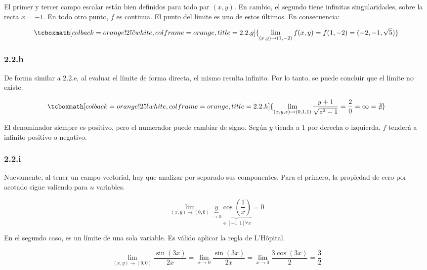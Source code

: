 \documentclass{article}
\begin{document}
El primer y tercer campo escalar están bien definidos para todo par $(x,y)$. En cambio, el segundo tiene infinitas singularidades, sobre la recta $x = -1$. En todo otro punto, $f$ es continua. El punto del límite es uno de estos últimos. En consecuencia:

\begin{equation}
\tcboxmath[colback=orange!25!white,colframe=orange,title=2.2.g]
{ \lim_{(x,y) \rightarrow (1,-2)} f(x,y) = f(1,-2) = (-2, -1, \sqrt{5}) }
\end{equation}

\subsubsection*{2.2.h}
\label{subsubsec:2.2.h}

De forma similar a 2.2.e, al evaluar el límite de forma directa, el mismo resulta infinito. Por lo tanto, se puede concluir que el límite no existe.

\begin{equation}
\tcboxmath[colback=orange!25!white,colframe=orange,title=2.2.h]
{ \lim_{(x,y,z) \rightarrow (0,1,1)} \frac{y+1}{\sqrt{z^2-1}} = \frac{2}{0} = \infty = \nexists }
\end{equation}

El denominador siempre es positivo, pero el numerador puede cambiar de signo. Según $y$ tienda a $1$ por derecha o izquierda, $f$ tenderá a infinito positivo o negativo.

\subsubsection*{2.2.i}
\label{subsubsec:2.2.i}

Nuevamente, al tener un campo vectorial, hay que analizar por separado sus componentes.
Para el primero, la propiedad de cero por acotado sigue valiendo para $n$ variables.

\begin{equation}
\lim_{(x,y) \rightarrow (0,0)} \underbrace{y}_{\rightarrow 0} \underbrace{ \cos \left( \frac{1}{x} \right) }_{\in [-1,1] \forall x} = 0
\end{equation}

En el segundo caso, es un límite de una sola variable. Es válido aplicar la regla de L'Hôpital.

\begin{equation}
\lim_{(x,y) \rightarrow (0,0)} \frac{\sin (3x)}{2x} = \lim_{x \rightarrow 0} \frac{\sin (3x)}{2x} = \lim_{x \rightarrow 0} \frac{3 \cos(3x)}{2} = \frac{3}{2}
\end{equation}
\end{document}
